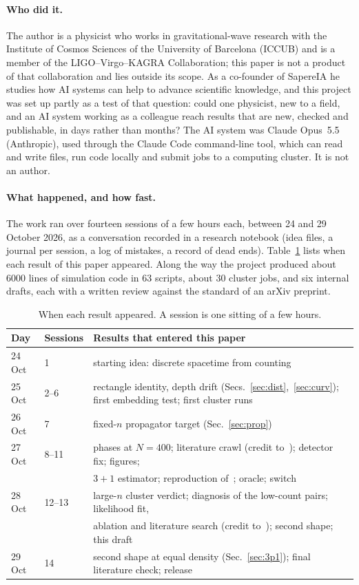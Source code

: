 \documentclass[11pt,a4paper]{article}
\begin{document}
\paragraph{Who did it.} The author is a physicist who works in gravitational-wave research with the Institute of Cosmos Sciences of the University of Barcelona (ICCUB) and is a member of the LIGO--Virgo--KAGRA Collaboration; this paper is not a product of that collaboration and lies outside its scope. As a co-founder of SapereIA he studies how AI systems can help to advance scientific knowledge, and this project was set up partly as a test of that question: could one physicist, new to a field, and an AI system working as a colleague reach results that are new, checked and publishable, in days rather than months? The AI system was Claude Opus~5.5 (Anthropic), used through the Claude Code command-line tool, which can read and write files, run code locally and submit jobs to a computing cluster. It is not an author.

\paragraph{What happened, and how fast.} The work ran over fourteen sessions of a few hours each, between 24 and 29 October 2026, as a conversation recorded in a research notebook (idea files, a journal per session, a log of mistakes, a record of dead ends). Table~\ref{tab:timeline} lists when each result of this paper appeared. Along the way the project produced about 6000 lines of simulation code in 63 scripts, about 30 cluster jobs, and six internal drafts, each with a written review against the standard of an arXiv preprint.

\begin{table}[h]
\centering\small
\begin{tabular}{@{}lll@{}}
\toprule
Day & Sessions & Results that entered this paper \\
\midrule
24 Oct & 1 & starting idea: discrete spacetime from counting \\
25 Oct & 2--6 & rectangle identity, depth drift (Secs.~\ref{sec:dist},~\ref{sec:curv}); first embedding test; first cluster runs \\
26 Oct & 7 & fixed-$n$ propagator target (Sec.~\ref{sec:prop}) \\
27 Oct & 8--11 & phases at $N=400$; literature crawl (credit to~\cite{CloughEvans16}); detector fix; figures; \\
 & & $3+1$ estimator; reproduction of~\cite{Johnston25}; oracle; switch \\
28 Oct & 12--13 & large-$n$ cluster verdict; diagnosis of the low-count pairs; likelihood fit, \\
 & & ablation and literature search (credit to~\cite{Casasola26}); second shape; this draft \\
29 Oct & 14 & second shape at equal density (Sec.~\ref{sec:3p1}); final literature check; release \\
\bottomrule
\end{tabular}
\caption{When each result appeared. A session is one sitting of a few hours.}\label{tab:timeline}
\end{table}
\end{document}
